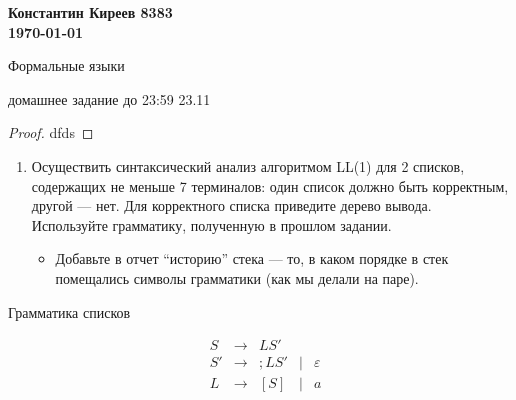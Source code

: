 \documentclass[12pt]{article}
\begin{document}
\begin{flushright}
\textbf{Константин Киреев 8383 \\
\today}
\end{flushright}

\begin{center} {\LARGE Формальные языки} \end{center}

\begin{center} \Large домашнее задание до 23:59 23.11 \end{center}
\bigskip



\begin{proof}
  dfds
\end{proof}

\begin{enumerate}
  \item
  {
    Осуществить синтаксический анализ алгоритмом LL(1) для 2 списков, содержащих не меньше 7 терминалов: один список должно быть корректным, другой --- нет. Для корректного списка приведите дерево вывода. Используйте грамматику, полученную в прошлом задании.
    \begin{itemize}
      \item Добавьте в отчет ``историю'' стека --- то, в каком порядке в стек помещались символы грамматики (как мы делали на паре).
    \end{itemize}
  }
\end{enumerate}

\bigskip

\begin{center} Грамматика списков \end{center}

    $$
    \begin{array}{cccccccccc}
       &S & \rightarrow & L S' \\
       &S'& \rightarrow & ; L S' & \mid & \varepsilon \\
       &L & \rightarrow &  [S] & \mid & a
    \end{array}
    $$
\end{document}
